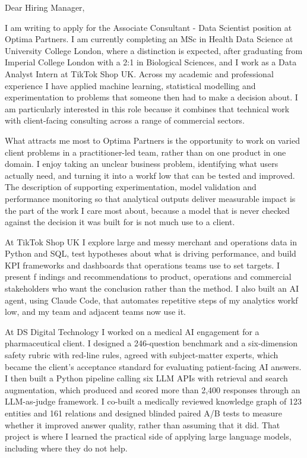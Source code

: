 \documentclass[letterpaper,11pt]{article}
\begin{document}
Dear Hiring Manager,

I am writing to apply for the Associate Consultant - Data Scientist position at Optima Partners. I am currently completing an MSc in Health Data Science at University College London, where a distinction is expected, after graduating from Imperial College London with a 2:1 in Biological Sciences, and I work as a Data Analyst Intern at TikTok Shop UK. Across my academic and professional experience I have applied machine learning, statistical modelling and experimentation to problems that someone then had to make a decision about. I am particularly interested in this role because it combines that technical work with client-facing consulting across a range of commercial sectors.

What attracts me most to Optima Partners is the opportunity to work on varied client problems in a practitioner-led team, rather than on one product in one domain. I enjoy taking an unclear business problem, identifying what users actually need, and turning it into a workf\kern0pt low that can be tested and improved. The description of supporting experimentation, model validation and performance monitoring so that analytical outputs deliver measurable impact is the part of the work I care most about, because a model that is never checked against the decision it was built for is not much use to a client.

At TikTok Shop UK I explore large and messy merchant and operations data in Python and SQL, test hypotheses about what is driving performance, and build KPI frameworks and dashboards that operations teams use to set targets. I present f\kern0pt indings and recommendations to product, operations and commercial stakeholders who want the conclusion rather than the method. I also built an AI agent, using Claude Code, that automates repetitive steps of my analytics workf\kern0pt low, and my team and adjacent teams now use it.

At DS Digital Technology I worked on a medical AI engagement for a pharmaceutical client. I designed a 246-question benchmark and a six-dimension safety rubric with red-line rules, agreed with subject-matter experts, which became the client's acceptance standard for evaluating patient-facing AI answers. I then built a Python pipeline calling six LLM APIs with retrieval and search augmentation, which produced and scored more than 2,400 responses through an LLM-as-judge framework. I co-built a medically reviewed knowledge graph of 123 entities and 161 relations and designed blinded paired A/B tests to measure whether it improved answer quality, rather than assuming that it did. That project is where I learned the practical side of applying large language models, including where they do not help.
\end{document}
